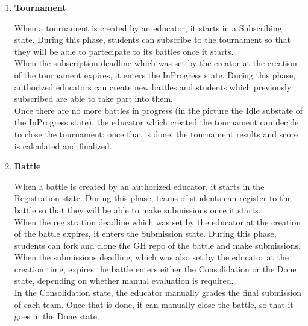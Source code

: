 \begin{enumerate}[label=\textbf{SD\arabic*}:,ref=SD\arabic*,leftmargin=1.3cm]
	\item \textbf{Tournament}
	      \begin{adjustbox}{
			      max size={\textwidth}{},
			      caption={Tournament state diagram},
			      label={fig:Tournament state diagram},
			      figure=H}
		      \centering
	      \end{adjustbox}

	      When a tournament is created by an educator, it starts in a Subscribing state.
	      During this phase, students can subscribe to the tournament so that they will
	      be able to partecipate to its battles once it starts.\\
	      When the subscription deadline which was set by the creator at the creation of
	      the tournament expires, it enters the InProgress state. During this phase,
	      authorized educators can create new battles and students which previously
	      subscribed are able to take part into them. \\
	      Once there are no more battles in progress (in the picture the Idle substate
	      of the InProgress state), the educator which created the tournament can decide
	      to close the tournament: once that is done, the tournament results and score
	      is calculated and finalized.
	      \pagebreak

	\item \textbf{Battle}
	      \begin{adjustbox}{
			      max size={\textwidth}{\textheightwithcaption{1}},
			      caption={Battle state diagram},
			      label={fig:Battle state diagram},
			      figure=H}
		      \centering
		      \puml{puml/battle-state}
	      \end{adjustbox}

	      When a battle is created by an authorized educator, it starts in the Registration state.
	      During this phase, teams of students can register to the battle so that they will
	      be able to make submissions once it starts.\\
	      When the registration deadline which was set by the educator at the creation of
	      the battle expires, it enters the Submission state. During this phase,
	      students can fork and clone the GH repo of the battle and make submissions. \\
	      When the submissions deadline, which was also set by the educator at the creation time,
	      expires the battle enters either the Consolidation or the Done state, depending on
	      whether manual evaluation is required. \\
	      In the Consolidation state, the educator manually grades the final submission of each
	      team. Once that is done, it can manually close the battle, so that it goes in the
	      Done state.
\end{enumerate}
\pagebreak

